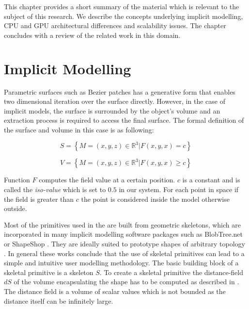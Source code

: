 \label{chapter:background}

\newlength{\savedunitlength}
\setlength{\unitlength}{2em}
This chapter provides a short summary of the material which is relevant to the subject of this research. 
We describe the concepts underlying implicit modelling, CPU and GPU architectural differences and 
scalability issues. The chapter concludes with a review of the related work in this domain.

\section{Implicit Modelling}
\label{sec:implicitmodellingintro}
Parametric surfaces such as Bezier patches has a generative form that enables 
two dimensional iteration over the surface directly. However, in the case of implicit models, 
the surface is surrounded by the object's volume and an extraction process is required to 
access the final surface. The formal definition of the surface and volume in this case is as following:

\begin{equation}
S = \left\{M = (x,y,z) \in \mathbb{R}^3 | F(x,y,x) = c\right\}
\end{equation}

\begin{equation}
V = \left\{M = (x,y,z) \in \mathbb{R}^3 | F(x,y,x) \geq c\right\}
\end{equation}

Function $F$ computes the field value at a certain position.  $c$ is a constant and is called the \textit{iso-value} 
which is set to $0.5$ in our system. For each point in space if the field is greater than $c$ the point is 
considered inside the model otherwise outside. 

Most of the primitives used in the \blob are built from geometric skeletons, which are incorporated in many implicit modelling software packages 
such as BlobTree.net \cite{Groot2008} or ShapeShop \cite{Schmidt2006}. They are ideally suited to prototype shapes of arbitrary topology 
\cite{Bloomenthal1997}. In general these works conclude that the use of skeletal primitives can lead to a simple and intuitive user modelling 
methodology. The basic building block of a skeletal primitive is a skeleton $S$. To create a skeletal primitive the distance-field $dS$ of the 
volume encapsulating the shape has to be computed as described in \cite{Barbier2004}. The distance field is a volume of scalar values which is 
not bounded as the distance itself can be infinitely large.

